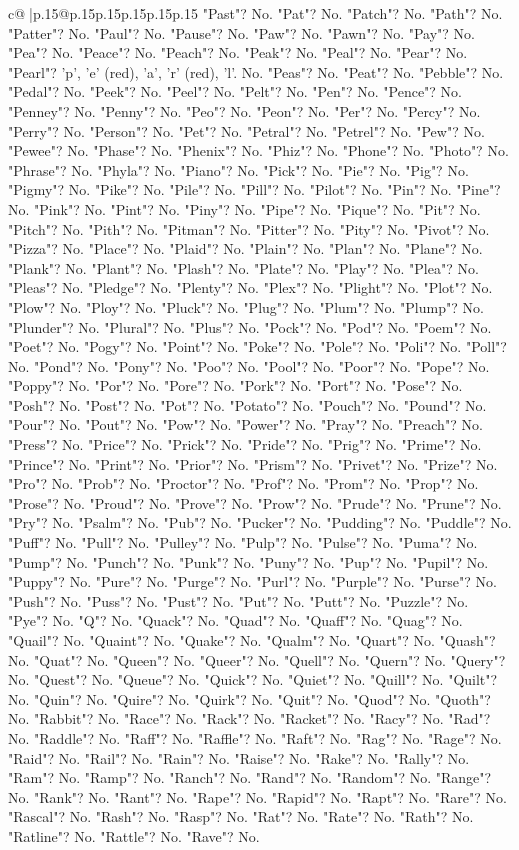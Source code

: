 \documentclass{article}
\begin{document}
{\begin{supertabular}{c@{$\;$}|p{.15\linewidth}@{}p{.15\linewidth}p{.15\linewidth}p{.15\linewidth}p{.15\linewidth}p{.15\linewidth}}
{{{"Past"? No. "Pat"? No. "Patch"? No. "Path"? No. "Patter"? No. "Paul"? No. "Pause"? No. "Paw"? No. "Pawn"? No. "Pay"? No. "Pea"? No. "Peace"? No. "Peach"? No. "Peak"? No. "Peal"? No. "Pear"? No. "Pearl"? 'p', 'e' (red), 'a', 'r' (red), 'l'. No. "Peas"? No. "Peat"? No. "Pebble"? No. "Pedal"? No. "Peek"? No. "Peel"? No. "Pelt"? No. "Pen"? No. "Pence"? No. "Penney"? No. "Penny"? No. "Peo"? No. "Peon"? No. "Per"? No. "Percy"? No. "Perry"? No. "Person"? No. "Pet"? No. "Petral"? No. "Petrel"? No. "Pew"? No. "Pewee"? No. "Phase"? No. "Phenix"? No. "Phiz"? No. "Phone"? No. "Photo"? No. "Phrase"? No. "Phyla"? No. "Piano"? No. "Pick"? No. "Pie"? No. "Pig"? No. "Pigmy"? No. "Pike"? No. "Pile"? No. "Pill"? No. "Pilot"? No. "Pin"? No. "Pine"? No. "Pink"? No. "Pint"? No. "Piny"? No. "Pipe"? No. "Pique"? No. "Pit"? No. "Pitch"? No. "Pith"? No. "Pitman"? No. "Pitter"? No. "Pity"? No. "Pivot"? No. "Pizza"? No. "Place"? No. "Plaid"? No. "Plain"? No. "Plan"? No. "Plane"? No. "Plank"? No. "Plant"? No. "Plash"? No. "Plate"? No. "Play"? No. "Plea"? No. "Pleas"? No. "Pledge"? No. "Plenty"? No. "Plex"? No. "Plight"? No. "Plot"? No. "Plow"? No. "Ploy"? No. "Pluck"? No. "Plug"? No. "Plum"? No. "Plump"? No. "Plunder"? No. "Plural"? No. "Plus"? No. "Pock"? No. "Pod"? No. "Poem"? No. "Poet"? No. "Pogy"? No. "Point"? No. "Poke"? No. "Pole"? No. "Poli"? No. "Poll"? No. "Pond"? No. "Pony"? No. "Poo"? No. "Pool"? No. "Poor"? No. "Pope"? No. "Poppy"? No. "Por"? No. "Pore"? No. "Pork"? No. "Port"? No. "Pose"? No. "Posh"? No. "Post"? No. "Pot"? No. "Potato"? No. "Pouch"? No. "Pound"? No. "Pour"? No. "Pout"? No. "Pow"? No. "Power"? No. "Pray"? No. "Preach"? No. "Press"? No. "Price"? No. "Prick"? No. "Pride"? No. "Prig"? No. "Prime"? No. "Prince"? No. "Print"? No. "Prior"? No. "Prism"? No. "Privet"? No. "Prize"? No. "Pro"? No. "Prob"? No. "Proctor"? No. "Prof"? No. "Prom"? No. "Prop"? No. "Prose"? No. "Proud"? No. "Prove"? No. "Prow"? No. "Prude"? No. "Prune"? No. "Pry"? No. "Psalm"? No. "Pub"? No. "Pucker"? No. "Pudding"? No. "Puddle"? No. "Puff"? No. "Pull"? No. "Pulley"? No. "Pulp"? No. "Pulse"? No. "Puma"? No. "Pump"? No. "Punch"? No. "Punk"? No. "Puny"? No. "Pup"? No. "Pupil"? No. "Puppy"? No. "Pure"? No. "Purge"? No. "Purl"? No. "Purple"? No. "Purse"? No. "Push"? No. "Puss"? No. "Pust"? No. "Put"? No. "Putt"? No. "Puzzle"? No. "Pye"? No. "Q"? No. "Quack"? No. "Quad"? No. "Quaff"? No. "Quag"? No. "Quail"? No. "Quaint"? No. "Quake"? No. "Qualm"? No. "Quart"? No. "Quash"? No. "Quat"? No. "Queen"? No. "Queer"? No. "Quell"? No. "Quern"? No. "Query"? No. "Quest"? No. "Queue"? No. "Quick"? No. "Quiet"? No. "Quill"? No. "Quilt"? No. "Quin"? No. "Quire"? No. "Quirk"? No. "Quit"? No. "Quod"? No. "Quoth"? No. "Rabbit"? No. "Race"? No. "Rack"? No. "Racket"? No. "Racy"? No. "Rad"? No. "Raddle"? No. "Raff"? No. "Raffle"? No. "Raft"? No. "Rag"? No. "Rage"? No. "Raid"? No. "Rail"? No. "Rain"? No. "Raise"? No. "Rake"? No. "Rally"? No. "Ram"? No. "Ramp"? No. "Ranch"? No. "Rand"? No. "Random"? No. "Range"? No. "Rank"? No. "Rant"? No. "Rape"? No. "Rapid"? No. "Rapt"? No. "Rare"? No. "Rascal"? No. "Rash"? No. "Rasp"? No. "Rat"? No. "Rate"? No. "Rath"? No. "Ratline"? No. "Rattle"? No. "Rave"? No. }}}
\end{supertabular}}
\end{document}

